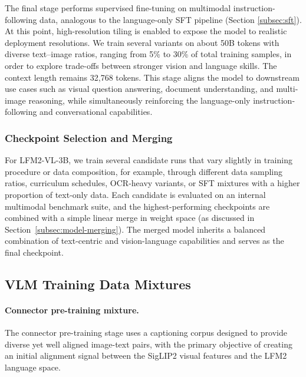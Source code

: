 \documentclass{article}
\begin{document}
The final stage performs supervised fine-tuning on multimodal instruction-following data, analogous to the language-only SFT pipeline (Section \ref{subsec:sft}). At this point, high-resolution tiling is enabled to expose the model to realistic deployment resolutions. We train several variants on about 50B tokens with diverse text–image ratios, ranging from 5\% to 30\% of total training samples, in order to explore trade-offs between stronger vision and language skills. The context length remains 32{,}768 tokens. This stage aligns the model to downstream use cases such as visual question answering, document understanding, and multi-image reasoning, while simultaneously reinforcing the language-only instruction-following and conversational capabilities.



\subsubsection{Checkpoint Selection and Merging}

For LFM2-VL-3B, we train several candidate runs that vary slightly in training procedure or data composition, for example, through different data sampling ratios, curriculum schedules, OCR-heavy variants, or SFT mixtures with a higher proportion of text-only data. Each candidate is evaluated on an internal multimodal benchmark suite, and the highest-performing checkpoints are combined with a simple linear merge in weight space (as discussed in Section~\ref{subsec:model-merging}). The merged model inherits a balanced combination of text-centric and vision-language capabilities and serves as the final checkpoint.

\subsection{VLM Training Data Mixtures}
\label{subsec:vlm-data}

\paragraph{Connector pre-training mixture.}
The connector pre-training stage uses a captioning corpus designed to provide diverse yet well aligned image-text pairs, with the primary objective of creating an initial alignment signal between the SigLIP2 visual features and the LFM2 language space.
\end{document}
